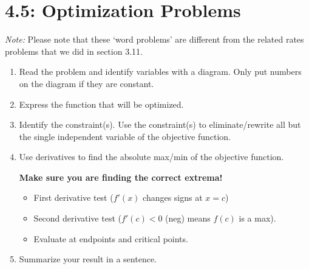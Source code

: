 \documentclass[../mathNotesPreamble]{subfiles}
\begin{document}
\section{4.5: Optimization Problems}
\textit{Note: } Please note that these `word problems' are different from the related rates problems that we did in section 3.11.

\begin{thmBox*}
  \begin{enumerate}
    \item Read the problem and identify variables with a diagram. Only put numbers on the diagram if they are constant.
    \item Express the function that will be optimized.
    \item Identify the constraint(s). Use the constraint(s) to eliminate/rewrite all but the single independent variable of the objective function.
    \item Use derivatives to find the absolute max/min of the objective function.
    
      \textbf{Make sure you are finding the correct extrema!}
      \begin{itemize}
        \item First derivative test ($f'(x)$ changes signs at $x=c$)
        \item Second derivative test ($f'(c)<0$ (neg) means $f(c)$ is a max).
        \item Evaluate at endpoints and critical points.
      \end{itemize}
    \item Summarize your result in a sentence.
  \end{enumerate}
\end{thmBox*}
\pagebreak
\end{document}
